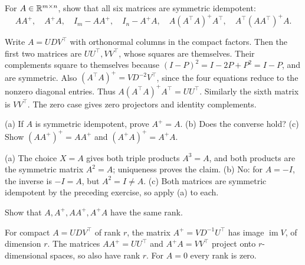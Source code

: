 \begin{problem}\label{ex:10:mp-projectors}
For \(A\in\mathbb R^{m\times n}\), show that all six matrices are symmetric idempotent:
\[
AA^+,\quad A^+A,\quad I_m-AA^+,\quad I_n-A^+A,
\quad A(A^\top A)^+A^\top,\quad A^\top(AA^\top)^+A.
\]
\end{problem}
\begin{solution}
Write \(A=UDV^\top\) with orthonormal columns in the compact factors.
Then the first two matrices are \(UU^\top,VV^\top\), whose squares
are themselves. Their complements square to themselves because
\((I-P)^2=I-2P+P^2=I-P\), and are symmetric.
Also \((A^\top A)^+=VD^{-2}V^\top\), since the four equations reduce
to the nonzero diagonal entries. Thus
\(A(A^\top A)^+A^\top=UU^\top\). Similarly the sixth matrix is
\(VV^\top\). The zero case gives zero projectors and identity complements.
\end{solution}

\begin{problem}\label{ex:10:self-inverse}
(a) If \(A\) is symmetric idempotent, prove \(A^+=A\).
(b) Does the converse hold?
(c) Show \((AA^+)^+=AA^+\) and \((A^+A)^+=A^+A\).
\end{problem}
\begin{solution}
(a) The choice \(X=A\) gives both triple products \(A^3=A\), and both
products are the symmetric matrix \(A^2=A\); uniqueness proves the claim.
(b) No: for \(A=-I\), the inverse is \(-I=A\), but \(A^2=I\ne A\).
(c) Both matrices are symmetric idempotent by the preceding exercise,
so apply (a) to each.
\end{solution}

\begin{problem}\label{ex:10:mp-ranks}
Show that \(A,A^+,AA^+,A^+A\) have the same rank.
\end{problem}
\begin{solution}
For compact \(A=UDV^\top\) of rank \(r\), the matrix
\(A^+=VD^{-1}U^\top\) has image \(\operatorname{im}V\), of dimension
\(r\). The matrices \(AA^+=UU^\top\) and \(A^+A=VV^\top\) project
onto \(r\)-dimensional spaces, so also have rank \(r\).
For \(A=0\) every rank is zero.
\end{solution}

